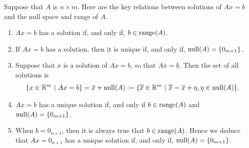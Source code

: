 \vspace*{0.2cm}

\begin{tcolorbox}[sharp corners, colback=green!30, colframe=green!80!blue, title=\textbf{\Large Relation of Null Space and Range to Solutions of Linear Equations}]

Suppose that $A$ is $n \times m$. Here are the key relations between solutions of $Ax=b$ and the null space and range of $A$.

\begin{enumerate}
\renewcommand{\labelenumi}{(\alph{enumi})}
\setlength{\itemsep}{.2cm}
\item  $Ax=b$ has a solution if, and only if, $b \in \mathrm{range}(A)$.
\item If $Ax=b$ has a solution, then it is unique if, and only if, $\mathrm{null}(A) = \{ 0_{m \times 1}\}$.
\item Suppose that $\overline{x}$ is a solution of $Ax=b$, so that $A\overline{x}=b$. Then the set of all solutions is
$$\{ x\in \real^m~|~ Ax = b \}= \overline{x} + \nullspace(A):=\{ \doverline{x} \in \real^m~|~ \doverline{x} = \overline{x} + \eta, \eta \in \nullspace(A) \}. $$
\item $Ax=b$ has a unique solution if, and only if $b \in \mathrm{range}(A)$ and $\mathrm{null}(A) = \{ 0_{m \times 1}\}$. 
\item When $b=0_{n \times 1}$, then it is always true that $b \in \mathrm{range}(A)$. Hence we deduce that $A x = 0_{n \times 1}$ has a unique solution if, and only if, $\mathrm{null}(A) = \{ 0_{m \times 1}\}$.
\end{enumerate}



\end{tcolorbox}
\vspace*{0.2cm}

